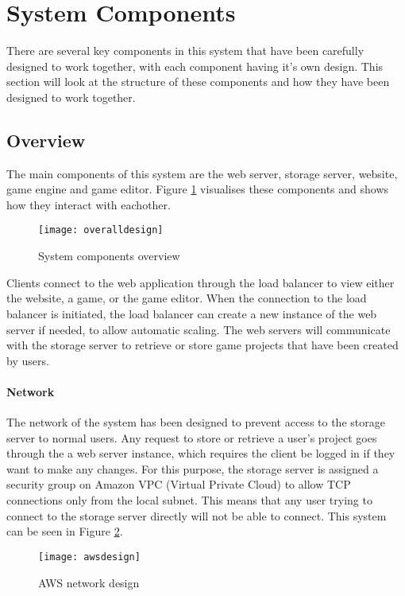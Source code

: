 
\section{System Components}
There are several key components in this system that have been carefully designed to work together, with each component having it's own design. This section will look at the structure of these components and how they have been designed to work together.

	\subsection{Overview}
	The main components of this system are the web server, storage server, website, game engine and game editor. Figure \ref{fig:overalldesign} visualises these components and shows how they interact with eachother. 

	\begin{figure}[h]
		\centering
		\texttt{[image: overalldesign]}
		\caption{System components overview}
		\label{fig:overalldesign}
	\end{figure}

	Clients connect to the web application through the load balancer to view either the website, a game, or the game editor. When the connection to the load balancer is initiated, the load balancer can create a new instance of the web server if needed, to allow automatic scaling. The web servers will communicate with the storage server to retrieve or store game projects that have been created by users.

	\paragraph{Network}
	The network of the system has been designed to prevent access to the storage server to normal users. Any request to store or retrieve a user's project goes through the a web server instance, which requires the client be logged in if they want to make any changes. For this purpose, the storage server is assigned a security group on Amazon VPC (Virtual Private Cloud) to allow TCP connections only from the local subnet. This means that any user trying to connect to the storage server directly will not be able to connect. This system can be seen in Figure \ref{fig:awsnetworkdesign}.

	\begin{figure}[h]
		\centering
		\texttt{[image: awsdesign]}
		\caption{AWS network design}
		\label{fig:awsnetworkdesign}
	\end{figure}

